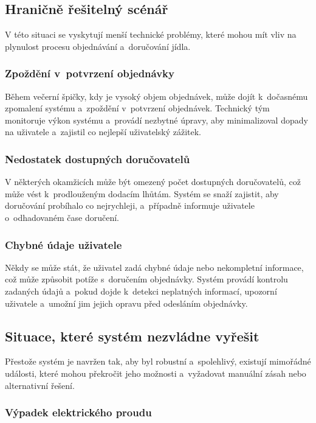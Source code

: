 	\subsection{Hraničně řešitelný scénář}

	V této situaci se vyskytují menší technické problémy, které mohou mít vliv na plynulost procesu objednávání a~doručování jídla.

    	\subsubsection{Zpoždění v~potvrzení objednávky} 

		Během večerní špičky, kdy je vysoký objem objednávek, může dojít k~dočasnému zpomalení systému a~zpoždění v~potvrzení objednávek. Technický tým monitoruje výkon systému a~provádí nezbytné úpravy, aby minimalizoval dopady na uživatele a~zajistil co nejlepší uživatelský zážitek.

    	\subsubsection{Nedostatek dostupných doručovatelů} 

		V některých okamžicích může být omezený počet dostupných doručovatelů, což může vést k~prodlouženým dodacím lhůtám. Systém se snaží zajistit, aby doručování probíhalo co nejrychleji, a~případně informuje uživatele o~odhadovaném čase doručení.

    	\subsubsection{Chybné údaje uživatele} 

		Někdy se může stát, že uživatel zadá chybné údaje nebo nekompletní informace, což může způsobit potíže s~doručením objednávky. Systém provádí kontrolu zadaných údajů a~pokud dojde k~detekci neplatných informací, upozorní uživatele a~umožní jim jejich opravu před odesláním objednávky.

	\subsection{Situace, které systém nezvládne vyřešit}

	Přestože systém je navržen tak, aby byl robustní a~spolehlivý, existují mimořádné události, které mohou překročit jeho možnosti a~vyžadovat manuální zásah nebo alternativní řešení.

    	\subsubsection{Výpadek elektrického proudu} 

